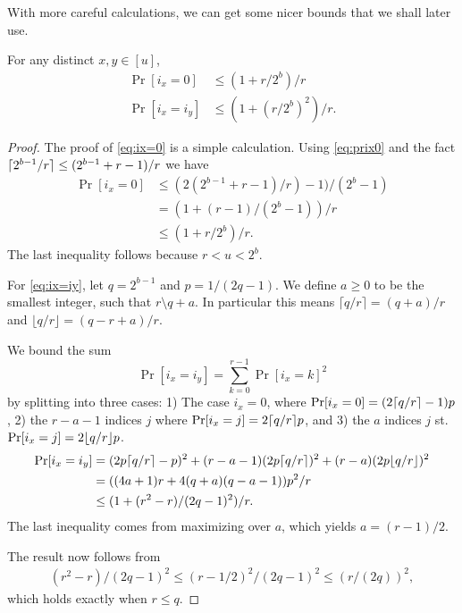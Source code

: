 With
more careful calculations, we can get some nicer bounds
that we shall later use.
\begin{lemma}\label{lem:ix-r-dist} For any distinct $x,y\in [u]$, 
   \begin{align}
      \Pr[i_x=0]&\le(1+r/2^b)/r\label{eq:ix=0}\\
      \Pr[i_x=i_y]&\leq \left(1+(r/2^b)^2\right)/r.\label{eq:ix=iy}
   \end{align}
\end{lemma}
\begin{proof}
   The proof of \eqref{eq:ix=0} is a simple calculation.
   Using \eqref{eq:prix0} and the fact $\lceil {2^{b-1}/r}\rceil\le(2^{b-1}+r-1)/r$ we have
   \begin{align*}
      \Pr[i_x=0]&\le (2(2^{b-1}+r-1)/r)-1)/(2^{b}-1)\\
                &=\left(1+(r-1)/(2^b-1)\right)/r\\
                &\le\left(1+r/2^b\right)/r.
   \end{align*}
   The last inequality follows because $r<u<2^b$.

   For \ref{eq:ix=iy},
   let $q=2^{b-1}$ and $p=1/(2q-1)$.
   We define $a\ge 0$ to be the smallest integer, such that $r\setminus q+a$.
   In particular this means 
   $\lceil q/r\rceil = (q+a)/r$ and
   $\lfloor q/r\rfloor = (q-r+a)/r$.

   We bound the sum
   $$
   \Pr[i_x=i_y]
   = \sum_{k=0}^{r-1} \Pr[i_x = k]^2
   $$
   by splitting into three cases:
   1) The case $i_x=0$, where $\Pr[i_x=0]=(2\lceil {q/r}\rceil-1)p$,
   2) the $r-a-1$ indices $j$ where $\Pr[i_x=j]=2\lceil {q/r}\rceil p$,
   and 3) the $a$ indices $j$ st. $\Pr[i_x=j]=2\lfloor {q/r} \rfloor p$.
   \begin{align*}
      \Pr[i_x=i_y]
   &=
   (2p\lceil { q/r}\rceil-p)^2 + (r-a-1) (2p \lceil q/r\rceil)^2 + (r-a) (2p \lfloor q/r \rfloor)^2
 \\&= ((4a+1)r+4(q+a)(q-a-1))p^2/r
 \\&\le (1 + (r^2-r)/(2q-1)^2) / r.
   \end{align*}
   The last inequality comes from maximizing over $a$, which yields $a=(r-1)/2$.

   The result now follows from
   \begin{align}
      (r^2-r)/(2q-1)^2
      \le
      (r-1/2)^2/(2q-1)^2
      \le
      (r/(2q))^2,
   \end{align}
   which holds exactly when $r\le q$.



\end{proof}
